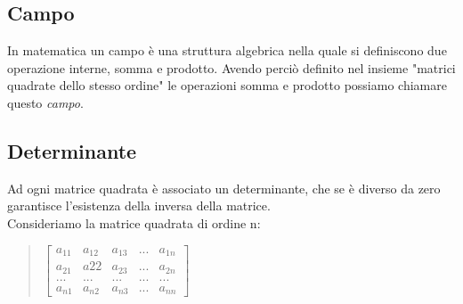 \documentclass[a4paper]{article}
\begin{document}
\begin{itemize}
\begin{quote}
$
\bigskip \\
$\left[\begin{matrix}1/a & 0 & \\ 0& 1/d\end{matrix}\right]
* \left[\begin{matrix}a & b & \\ c & d\end{matrix}\right]
=\left[\begin{matrix}1&0 \\ 0&1 \end{matrix}\right]
$\end{quote}
\end{itemize}

\subsection{Campo}
In matematica un campo è una struttura algebrica nella quale si definiscono due operazione interne, somma e prodotto. Avendo perciò definito nel insieme "matrici quadrate dello stesso ordine" le operazioni somma e prodotto possiamo chiamare questo \textit{campo}.

\subsection{Determinante}
Ad ogni matrice quadrata è associato un determinante, che se è diverso da zero garantisce l’esistenza della inversa della matrice.
\\ Consideriamo la matrice quadrata di ordine n:
\\
\begin{quote} \centering
$\left[\begin{matrix}a_{11} & a_{12} & a_{13} & ... & a_{1n} \\ a_{21} & a{22} & a_{23} & ... & a_{2n} \\ ... & ... & ... & ... & ...\\ a_{n1} & a_{n2} & a_{n3} & ... & a_{nn}\end{matrix}\right]
$ \end{quote}
\end{document}
